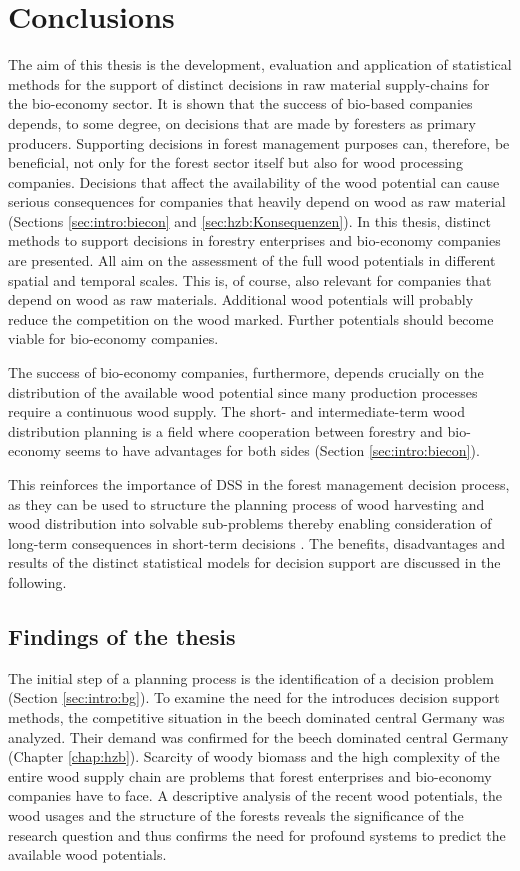 \chapter{Conclusions}
\label{chap:discussion}
\newpage
\noindent
The aim of this thesis is the development, evaluation and application of statistical methods for the support of distinct decisions in raw material supply-chains for the bio-economy sector. It is shown that the success of bio-based companies depends, to some degree, on decisions that are made by foresters as primary producers. Supporting decisions in forest management purposes can, therefore, be beneficial, not only for the forest sector itself but also for wood processing companies. Decisions that affect the availability of the wood potential can cause serious consequences for companies that heavily depend on wood as raw material (Sections \ref{sec:intro:biecon} and \ref{sec:hzb:Konsequenzen}). In this thesis, distinct methods to support decisions in forestry enterprises and bio-economy companies are presented. All aim on the assessment of the full wood potentials in different spatial and temporal scales. This is, of course, also relevant for companies that depend on wood as raw materials. Additional wood potentials will probably reduce the competition on the wood marked. Further potentials should become viable for bio-economy companies.

The success of bio-economy companies, furthermore, depends crucially on the distribution of the available wood potential since many production processes require a continuous wood supply. The short- and intermediate-term wood distribution planning is a field where cooperation between forestry and bio-economy seems to have advantages for both sides (Section \ref{sec:intro:biecon}).

This reinforces the importance of DSS in the forest management decision process, as they can be used to structure the planning process of wood harvesting and wood distribution into solvable sub-problems thereby enabling consideration of long-term consequences in short-term decisions \citep[p. 1065-1067, 1081]{pretzsch_2008}. The benefits, disadvantages and results of the distinct statistical models for decision support are discussed in the following.

\section{Findings of the thesis}
\label{sec:discussion:findings}
The initial step of a planning process is the identification of a decision problem (Section \ref{sec:intro:bg}). To examine the need for the introduces decision support methods, the competitive situation in the beech dominated central Germany was analyzed. Their demand was confirmed for the beech dominated central Germany (Chapter \ref{chap:hzb}). Scarcity of woody biomass and the high complexity of the entire wood supply chain are problems that forest enterprises and bio-economy companies have to face. A descriptive analysis of the recent wood potentials, the wood usages and the structure of the forests reveals the significance of the research question and thus confirms the need for profound systems to predict the available wood potentials.

